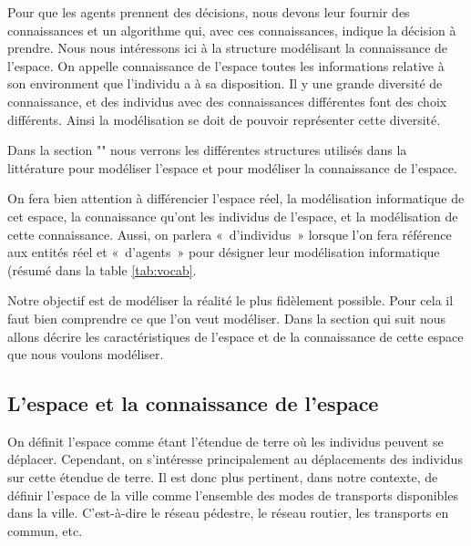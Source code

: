 \documentclass[a4paper]{article}
\begin{document}
Pour que les agents prennent des décisions, nous devons leur fournir des
connaissances et un algorithme qui, avec ces connaissances, indique la décision
à prendre. Nous nous intéressons ici à la structure modélisant la connaissance
de l'espace. On appelle connaissance de l'espace toutes les informations
relative à son environment que l'individu a à sa disposition. Il y une grande
diversité de connaissance, et des individus avec des connaissances différentes
font des choix différents. Ainsi la modélisation se doit de pouvoir représenter
cette diversité.

Dans la section "" nous verrons les différentes structures
utilisés dans la littérature pour modéliser l'espace et pour modéliser la
connaissance de l'espace.

On fera bien attention à différencier l'espace réel, la modélisation
informatique de cet espace, la connaissance qu'ont les individus de l'espace, et
la modélisation de cette connaissance. Aussi, on parlera «~d'individus~» lorsque
l'on fera référence aux entités réel et «~d'agents~» pour désigner leur
modélisation informatique (résumé dans la table \ref{tab:vocab}.

\begin{table}
  \noindent{}
  \caption{Le vocabulaire utilisé}
  \label{tab:vocab}
\end{table}

Notre objectif est de modéliser la réalité le plus fidèlement possible. Pour
cela il faut bien comprendre ce que l'on veut modéliser. Dans la section qui
suit nous allons décrire les caractéristiques de l'espace et de la connaissance
de cette espace que nous voulons modéliser.

\subsection{L'espace et la connaissance de l'espace}

On définit l'espace comme étant l'étendue de terre où les individus peuvent se
déplacer. Cependant, on s'intéresse principalement au déplacements des individus
sur cette étendue de terre. Il est donc plus pertinent, dans notre contexte, de
définir l'espace de la ville comme l'ensemble des modes de transports
disponibles dans la ville. C'est-à-dire le réseau pédestre, le réseau routier,
les transports en commun, etc.
\end{document}
